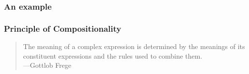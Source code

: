\documentclass[12pt,t]{beamer}
\begin{document}
\begin{frame}
  \frametitle{An example}
  \centering
  \vfill
  \vfill
\end{frame}

\begin{frame}
  \frametitle{Principle of Compositionality}
  \centering
  \vfill
  \begin{quote}
  The meaning of a complex expression is determined by the meanings of
  its constituent expressions and the rules used to combine them.\\
  \hfill---Gottlob Frege
  \end{quote}
  \vfill
\end{frame}
\end{document}
